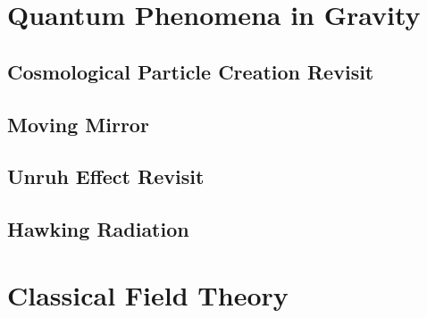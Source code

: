 \documentclass[12pt]{article}
\numberwithin{equation}{section}
\theoremstyle{1style}
\begin{document}
\section{Quantum Phenomena in Gravity}


\subsection{Cosmological Particle Creation Revisit}



\subsection{Moving Mirror}


\subsection{Unruh Effect Revisit}
\subsection{Hawking Radiation}


\newpage
\appendix
{}





\section{Classical Field Theory}


\newpage
\newpage
\end{document}
